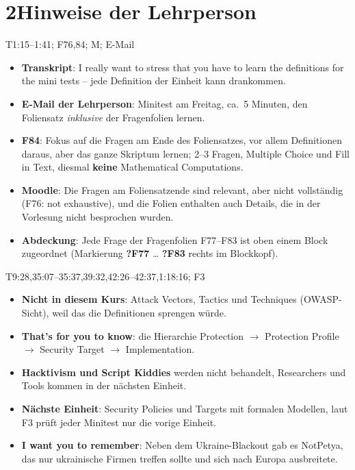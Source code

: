 \documentclass[10pt,a4paper]{article}
\newcommand{\block}[2]{\par\vspace{3pt}{\bfseries #1}\hfill{\scriptsize #2}\par\nopagebreak}
\begin{document}
\section*{2\quad Hinweise der Lehrperson}
\block{Was kommt zum Minitest?}{T1:15--1:41; F76,84; M; E-Mail}
\begin{itemize}
\item \textbf{Transkript}: \glqq I really want to stress that you have to learn the definitions for the mini tests\grqq{} -- jede Definition der Einheit kann drankommen.
\item \textbf{E-Mail der Lehrperson}: Minitest am Freitag, ca.\ 5 Minuten, den Foliensatz \emph{inklusive} der Fragenfolien lernen.
\item \textbf{F84}: Fokus auf die Fragen am Ende des Foliensatzes, vor allem Definitionen daraus, aber das ganze Skriptum lernen; 2--3 Fragen, Multiple Choice und Fill in Text, diesmal \textbf{keine} Mathematical Computations.
\item \textbf{Moodle}: Die Fragen am Foliensatzende sind relevant, aber nicht vollständig (F76: \glqq not exhaustive\grqq), und die Folien enthalten auch Details, die in der Vorlesung nicht besprochen wurden.
\item \textbf{Abdeckung}: Jede Frage der Fragenfolien F77--F83 ist oben einem Block zugeordnet (Markierung \textbf{?F77} \dots{} \textbf{?F83} rechts im Blockkopf).
\end{itemize}
\block{Abgrenzung und ausdrückliche Merk-Hinweise}{T9:28,35:07--35:37,39:32,42:26--42:37,1:18:16; F3}
\begin{itemize}
\item \textbf{Nicht in diesem Kurs}: Attack Vectors, Tactics und Techniques (OWASP-Sicht), weil das die Definitionen sprengen würde.
\item \textbf{\glqq That's for you to know\grqq}: die Hierarchie Protection $\rightarrow$ Protection Profile $\rightarrow$ Security Target $\rightarrow$ Implementation.
\item \textbf{Hacktivism und Script Kiddies} werden nicht behandelt, Researchers und Tools kommen in der nächsten Einheit.
\item \textbf{Nächste Einheit}: Security Policies und Targets mit formalen Modellen, laut F3 prüft jeder Minitest nur die vorige Einheit.
\item \textbf{\glqq I want you to remember\grqq}: Neben dem Ukraine-Blackout gab es NotPetya, das nur ukrainische Firmen treffen sollte und sich nach Europa ausbreitete.
\end{itemize}
\end{document}
